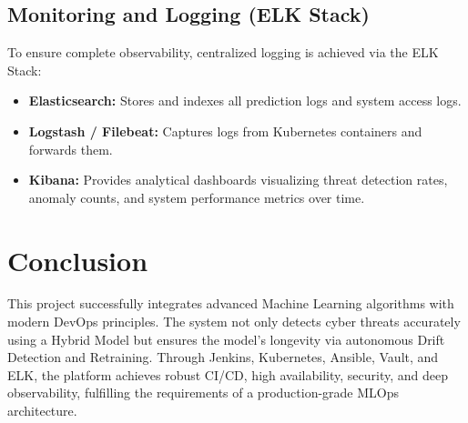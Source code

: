 \documentclass[12pt]{article}
\begin{document}

\subsection{Monitoring and Logging (ELK Stack)}
To ensure complete observability, centralized logging is achieved via the ELK Stack:
\begin{itemize}
    \item \textbf{Elasticsearch:} Stores and indexes all prediction logs and system access logs.
    \item \textbf{Logstash / Filebeat:} Captures logs from Kubernetes containers and forwards them.
    \item \textbf{Kibana:} Provides analytical dashboards visualizing threat detection rates, anomaly counts, and system performance metrics over time.
\end{itemize}


\section{Conclusion}
This project successfully integrates advanced Machine Learning algorithms with modern DevOps principles. The system not only detects cyber threats accurately using a Hybrid Model but ensures the model's longevity via autonomous Drift Detection and Retraining. Through Jenkins, Kubernetes, Ansible, Vault, and ELK, the platform achieves robust CI/CD, high availability, security, and deep observability, fulfilling the requirements of a production-grade MLOps architecture.
\end{document}
